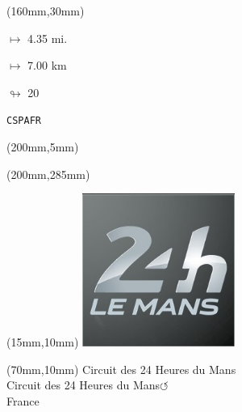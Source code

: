\begin{textblock*}{40mm}(160mm,30mm)%
\Large
\par$\mapsto$ 4.35 mi.
\par$\mapsto$ 7.00 km
\par$\looparrowright$ 20
\par\hfill\tiny\tt CSPAFR\\
\end{textblock*}
\begin{textblock*}{20mm}(200mm,5mm)%
\fbox{\thepage}
\label{CSPAFR}
\end{textblock*}
\begin{textblock*}{20mm}(200mm,285mm)%
\fbox{\thepage}
\end{textblock*}

\null\newpage
\begin{textblock*}{50mm}(15mm,10mm)%
\includegraphics[width=50mm]{LG/2015-05-20_00084.png}
\end{textblock*}
\begin{textblock*}{130mm}(70mm,10mm)%
{\fontsize{20}{20}\selectfont Circuit des 24 Heures du Mans\\}
{\fontsize{16}{16}\selectfont Circuit des 24 Heures du Mans\hfill \huge$\circlearrowleft$\\}
{\fontsize{12}{12}\selectfont France\\}
\end{textblock*}
